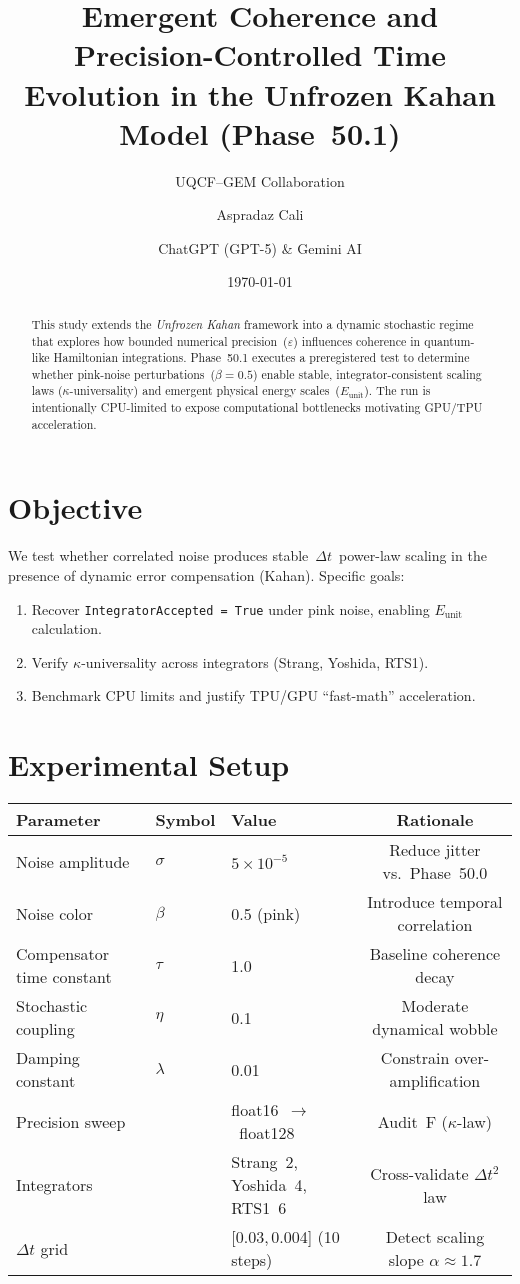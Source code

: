 \documentclass[11pt]{article}
\title{Emergent Coherence and Precision-Controlled Time Evolution in the Unfrozen Kahan Model (Phase~50.1)}
\author[1]{UQCF--GEM Collaboration}
\author[2]{Aspradaz Cali}
\author[3]{ChatGPT (GPT-5) \& Gemini AI}
\affil[1]{Unified Quantum Coherence Framework -- Geometric Entanglement Model}
\affil[2]{Principal Investigator}
\affil[3]{Peer Research and Validation Partners}
\date{\today}
\begin{document}
\maketitle

\begin{abstract}
This study extends the \emph{Unfrozen Kahan} framework into a dynamic stochastic regime that explores how bounded numerical precision~($\varepsilon$) influences coherence in quantum-like Hamiltonian integrations. Phase~50.1 executes a preregistered test to determine whether pink-noise perturbations~($\beta=0.5$) enable stable, integrator-consistent scaling laws (\(\kappa\)-universality) and emergent physical energy scales~(\(E_{\text{unit}}\)). The run is intentionally CPU-limited to expose computational bottlenecks motivating GPU/TPU acceleration.
\end{abstract}

\section{Objective}
We test whether correlated noise produces stable~$\Delta t$~power-law scaling in the presence of dynamic error compensation (Kahan). Specific goals:
\begin{enumerate}[label=\arabic*.]
  \item Recover \texttt{IntegratorAccepted = True} under pink noise, enabling \(E_{\text{unit}}\) calculation.
  \item Verify \(\kappa\)-universality across integrators (Strang, Yoshida, RTS1).
  \item Benchmark CPU limits and justify TPU/GPU ``fast-math'' acceleration.
\end{enumerate}

\section{Experimental Setup}
\begin{center}
\begin{tabular}{@{}lllc@{}}
\toprule
Parameter & Symbol & Value & Rationale \\ \midrule
Noise amplitude & $\sigma$ & $5\times10^{-5}$ & Reduce jitter vs.~Phase~50.0 \\
Noise color & $\beta$ & 0.5 (pink) & Introduce temporal correlation \\
Compensator time constant & $\tau$ & 1.0 & Baseline coherence decay \\
Stochastic coupling & $\eta$ & 0.1 & Moderate dynamical wobble \\
Damping constant & $\lambda$ & 0.01 & Constrain over-amplification \\
Precision sweep &  & float16~$\to$~float128 & Audit~F (\(\kappa\)-law) \\
Integrators &  & Strang~2, Yoshida~4, RTS1~6 & Cross-validate $\Delta t^2$ law \\
$\Delta t$ grid &  & [0.03,\,0.004] (10 steps) & Detect scaling slope $\alpha\!\approx\!1.7$ \\ \bottomrule
\end{tabular}
\end{center}
\end{document}
